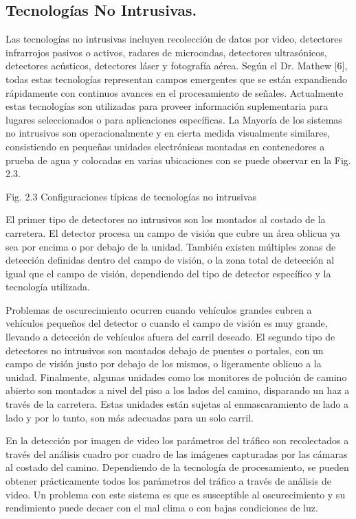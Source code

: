 \documentclass[final,fmstyle]{fpunathesis}
\begin{document}
\subsection{Tecnologías No Intrusivas.}

Las tecnologías no intrusivas incluyen recolección de datos por video, detectores infrarrojos pasivos o activos, radares de microondas, detectores ultrasónicos, detectores acústicos, detectores láser y fotografía aérea. Según el Dr. Mathew [6], todas estas tecnologías representan campos emergentes que se están expandiendo rápidamente con continuos avances en el procesamiento de señales. Actualmente estas tecnologías son utilizadas para proveer información suplementaria para lugares seleccionados o para aplicaciones específicas. La Mayoría de los sistemas no intrusivos son operacionalmente y en cierta medida visualmente similares, consistiendo en pequeñas unidades electrónicas montadas en contenedores a prueba de agua y colocadas en varias ubicaciones con se puede observar en la Fig. 2.3.

Fig. 2.3 Configuraciones típicas de tecnologías no intrusivas

El primer tipo de detectores no intrusivos son los montados al costado de la carretera. El detector procesa un campo de visión que cubre un área oblicua ya sea por encima o por debajo de la unidad. También existen múltiples zonas de detección definidas dentro del campo de visión,  o la zona total de detección al igual que el campo de visión, dependiendo del tipo de detector específico y la tecnología utilizada.

Problemas de oscurecimiento ocurren cuando vehículos grandes cubren a vehículos pequeños del detector o cuando el campo de visión es muy grande, llevando a detección de vehículos afuera del carril deseado. El segundo tipo de detectores no intrusivos son montados debajo de puentes o portales, con un campo de visión justo por debajo de los mismos, o ligeramente oblicuo a la unidad. Finalmente, algunas unidades como los monitores de polución de camino abierto son montados a nivel del piso a los lados del camino, disparando un haz a través de la carretera. Estas unidades están sujetas al enmascaramiento de lado a lado y por lo tanto, son más adecuadas para un solo carril.

En la detección por imagen de video los parámetros del tráfico son recolectados a través del análisis cuadro por cuadro de las imágenes capturadas por las cámaras al costado del camino. Dependiendo de la tecnología de procesamiento, se pueden obtener prácticamente todos los parámetros del tráfico a través de análisis de video. Un problema con este sistema es que es susceptible al oscurecimiento y su rendimiento puede decaer con el mal clima o con bajas condiciones de luz.
\end{document}
